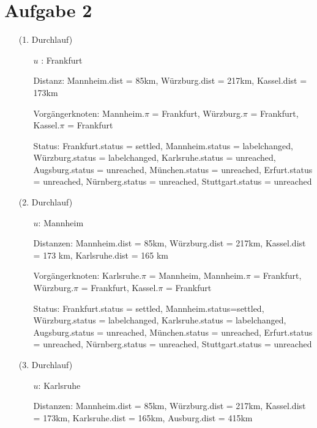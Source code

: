 \documentclass{article}
\begin{document}
\section*{Aufgabe 2}
\begin{itemize}
\item[(1. Durchlauf)]
\begin{itemize}
\item[$u$]: Frankfurt \\
\item[Distanz:] Mannheim.dist = 85km, Würzburg.dist = 217km, Kassel.dist = 173km \\
\item[Vorgängerknoten:] Mannheim.$\pi$ = Frankfurt, Würzburg.$\pi$ = Frankfurt, Kassel.$\pi$ = Frankfurt \\
\item[Status:] Frankfurt.status = settled, Mannheim.status = labelchanged, Würzburg.status = labelchanged, Karlsruhe.status = unreached, Augsburg.status = unreached, München.status = unreached, Erfurt.status = unreached, Nürnberg.status = unreached, Stuttgart.status = unreached \\
\end{itemize}
\item[(2. Durchlauf)]
\begin{itemize}
\item[$u$:] Mannheim \\
\item[Distanzen:] Mannheim.dist = 85km, Würzburg.dist = 217km, Kassel.dist = 173 km, Karlsruhe.dist = 165 km \\
\item[Vorgängerknoten:] Karlsruhe.$\pi$ = Mannheim,  Mannheim.$\pi$ = Frankfurt, Würzburg.$\pi$ = Frankfurt, Kassel.$\pi$ = Frankfurt \\
\item[Status:] Frankfurt.status = settled, Mannheim.status=settled, Würzburg.status = labelchanged, Karlsruhe.status = labelchanged, Augsburg.status = unreached, München.status = unreached, Erfurt.status = unreached, Nürnberg.status = unreached, Stuttgart.status = unreached \\
\end{itemize}
\item[(3. Durchlauf)]
\begin{itemize}
\item[$u$:] Karlsruhe \\
\item[Distanzen:] Mannheim.dist = 85km, Würzburg.dist = 217km, Kassel.dist = 173km, Karlsruhe.dist = 165km, Ausburg.dist = 415km \\

\end{itemize}
\end{itemize}
\end{document}
